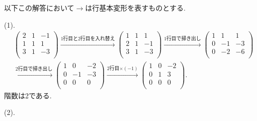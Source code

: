 \documentclass[dvipdfmx,a4paper,11pt]{article}
\theoremstyle{definition}
\begin{document}
 \vspace{11pt}
 
\hspace{-11pt}{\Large $\bullet$ 第4問解答例.}

以下この解答において$\longrightarrow$は行基本変形を表すものとする.

(1).
\begin{align*}
 &\begin{pmatrix}
 2& 1& -1 \\
 1& 1& 1 \\
 3& 1& -3 \\
 \end{pmatrix}
 \overset{\text{1行目と2行目を入れ替え}}{\longrightarrow} 
 \begin{pmatrix}
  1& 1& 1 \\
 2& 1& -1 \\
 3& 1& -3 \\
 \end{pmatrix}
 \overset{\text{1行目で掃き出し}}{\longrightarrow} 
 \begin{pmatrix}
  1& 1& 1 \\
 0& -1& -3 \\
 0&-2& -6 \\
 \end{pmatrix} \\
 &   \overset{\text{2行目で掃き出し}}{\longrightarrow} 
 \begin{pmatrix}
  1& 0& -2 \\
 0& -1& -3 \\
 0&0& 0\\
 \end{pmatrix}
 \overset{\text{2行目$\times (-1)$}}{\longrightarrow} 
 \begin{pmatrix}
  1& 0& -2 \\
 0& 1& 3 \\
 0&0& 0\\
 \end{pmatrix}.
 \end{align*}
階数は2である.

(2).
\end{document}
